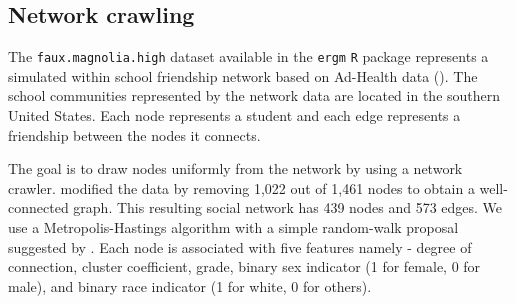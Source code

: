 \documentclass[11pt]{article}
\theoremstyle{remark}
\begin{document}
\subsection{Network crawling}


The \texttt{faux.magnolia.high} dataset available in the \texttt{ergm} \texttt{R} package represents a simulated within school friendship network based on Ad-Health data (\cite{resnick1997protecting}). The school communities represented by the network data are located in the southern United States. Each node represents a student and each edge represents a friendship between the nodes it connects.

The goal is to draw nodes uniformly from the network by using a network crawler. \cite{nilakanta2019ensuring} modified the data by removing 1,022 out of 1,461 nodes to obtain a well-connected graph. This resulting social network has 439 nodes and 573 edges. We use a Metropolis-Hastings algorithm with a simple random-walk  proposal suggested by \cite{gjoka2011practical}. Each node is associated with five features namely - degree of connection, cluster coefficient, grade, binary sex indicator (1 for female, 0 for male), and binary race indicator (1 for white, 0 for others).\\
\end{document}
